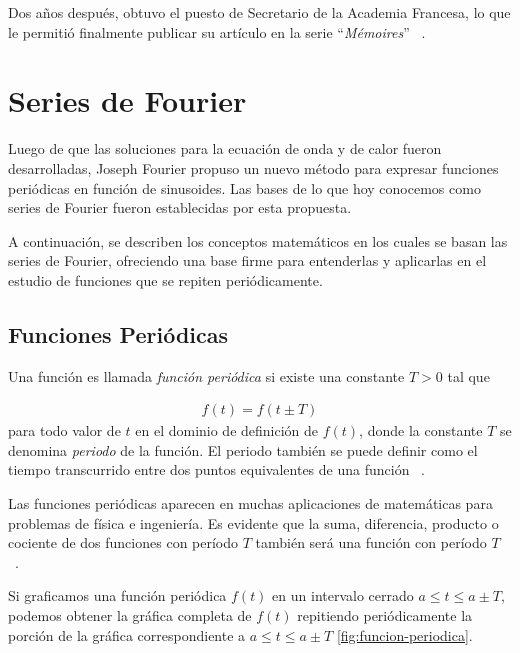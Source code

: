 Dos años después, obtuvo el puesto de Secretario de la Academia Francesa, lo que le permitió finalmente publicar su artículo en la serie “\textit{Mémoires}” ~\cite{historia-alambert-fourier-euler}.

\section{Series de Fourier}
Luego de que las soluciones para la ecuación de onda y de calor fueron desarrolladas, Joseph Fourier propuso un nuevo método para expresar funciones periódicas en función de sinusoides. Las bases de lo que hoy conocemos como series de Fourier fueron establecidas por esta propuesta.\newline

A continuación, se describen los conceptos matemáticos en los cuales se basan las series de Fourier, ofreciendo una base firme para entenderlas y aplicarlas en el estudio de funciones que se repiten periódicamente.
\subsection{Funciones Periódicas}
Una función es llamada \textit{función periódica} si existe una constante \( T > 0\) tal que

\begin{equation} \label{eq19}
	\begin{split}
		f(t) = f(t \pm T)
	\end{split}
\end{equation}
para todo valor de \( t \) en el dominio de definición de $f(t)$, donde la constante \( T \) se denomina \textit{periodo} de la función. El periodo también se puede definir como el tiempo transcurrido entre dos puntos equivalentes de una función ~\cite{fourierTolstov}.

Las funciones periódicas aparecen en muchas aplicaciones de matemáticas para problemas de física e ingeniería. Es evidente que la suma, diferencia, producto o cociente de dos funciones con período $T$ también será una función con período $T$ ~\cite{fourierTolstov}.

Si graficamos una función periódica $f(t)$ en un intervalo cerrado $a \leq t \leq a \pm T$, podemos obtener la gráfica completa de $f(t)$ repitiendo periódicamente la porción de la gráfica correspondiente a $a \leq t \leq a \pm T$ \ref{fig:funcion-periodica}.

